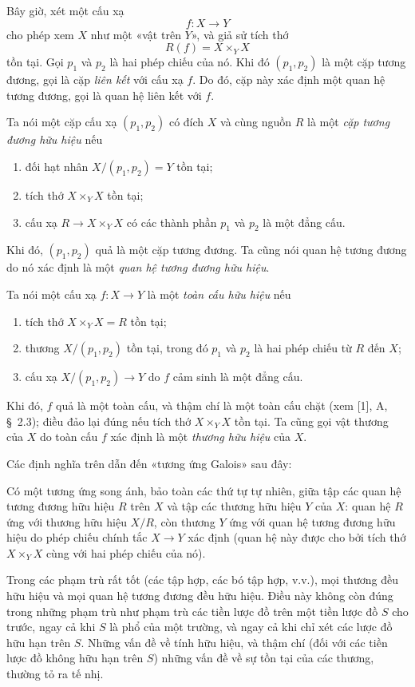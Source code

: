 Bây giờ, xét một cấu xạ
\[
  f:X\longrightarrow Y
\]
cho phép xem $X$ như một «vật trên $Y$», và giả sử tích thớ
\[
  R(f)=X\times_Y X
\]
tồn tại. Gọi $p_1$ và $p_2$ là hai phép chiếu của nó. Khi đó $(p_1,p_2)$ là
một cặp tương đương, gọi là cặp \emph{liên kết} với cấu xạ $f$. Do đó, cặp
này xác định một quan hệ tương đương, gọi là quan hệ liên kết với $f$.

Ta nói một cặp cấu xạ $(p_1,p_2)$ có đích $X$ và cùng nguồn $R$ là một
\emph{cặp tương đương hữu hiệu} nếu
\begin{enumerate}
  \item[(i)] đối hạt nhân $X/(p_1,p_2)=Y$ tồn tại;
  \item[(ii)] tích thớ $X\times_Y X$ tồn tại;
  \item[(iii)] cấu xạ $R\longrightarrow X\times_Y X$ có các thành phần $p_1$ và
  $p_2$ là một đẳng cấu.
\end{enumerate}
Khi đó, $(p_1,p_2)$ quả là một cặp tương đương. Ta cũng nói quan hệ tương
đương do nó xác định là một \emph{quan hệ tương đương hữu hiệu}.

Ta nói một cấu xạ $f:X\longrightarrow Y$ là một \emph{toàn cấu hữu hiệu}
nếu
\begin{enumerate}
  \item[(i)] tích thớ $X\times_Y X=R$ tồn tại;
  \item[(ii)] thương $X/(p_1,p_2)$ tồn tại, trong đó $p_1$ và $p_2$ là hai phép
  chiếu từ $R$ đến $X$;
  \item[(iii)] cấu xạ $X/(p_1,p_2)\longrightarrow Y$ do $f$ cảm sinh là một
  đẳng cấu.
\end{enumerate}
Khi đó, $f$ quả là một toàn cấu, và thậm chí là một toàn cấu chặt (xem [1],
A, \S~2.3); điều đảo lại đúng nếu tích thớ $X\times_Y X$ tồn tại. Ta cũng
gọi vật thương của $X$ do toàn cấu $f$ xác định là một \emph{thương hữu hiệu}
của $X$.

Các định nghĩa trên dẫn đến «tương ứng Galois» sau đây:

 Có một tương ứng song ánh, bảo toàn các thứ tự tự
nhiên, giữa tập các quan hệ tương đương hữu hiệu $R$ trên $X$ và tập các
thương hữu hiệu $Y$ của $X$: quan hệ $R$ ứng với thương hữu hiệu $X/R$, còn
thương $Y$ ứng với quan hệ tương đương hữu hiệu do phép chiếu chính tắc
$X\longrightarrow Y$ xác định (quan hệ này được cho bởi tích thớ $X\times_Y X$
cùng với hai phép chiếu của nó).

Trong các phạm trù rất tốt (các tập hợp, các bó tập hợp, v.v.), mọi thương đều
hữu hiệu và mọi quan hệ tương đương đều hữu hiệu. Điều này không còn đúng
trong những phạm trù như phạm trù các tiền lược đồ trên một tiền lược đồ $S$
cho trước, ngay cả khi $S$ là phổ của một trường, và ngay cả khi chỉ xét các
lược đồ hữu hạn trên $S$. Những vấn đề về tính hữu hiệu, và thậm chí (đối với
các tiền lược đồ không hữu hạn trên $S$) những vấn đề về sự tồn tại của các
thương, thường tỏ ra tế nhị.

